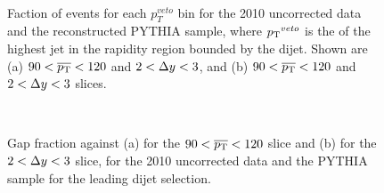 \begin{figure}
\centering
\mbox{
              \quad
              \quad
                              }
\caption[Comparison of $p_T^{veto}$ distribution between the data and the reconstructed PYTHIA sample ]{
Faction of events for each $p_T^{veto}$ bin for the 2010 uncorrected data and the reconstructed PYTHIA sample, where $\mbox{$p_{\rm T}$}{}^{veto}$ is the \pt{} of the highest jet in the rapidity region bounded by the dijet. 
Shown are (a) $90<\mbox{$\overline{p_{\rm T}}$}{}<120$ and $2 < \mbox{$\Delta y$}{} <3$, and (b) $90<\mbox{$\overline{p_{\rm T}}$}{}<120$ and $2 < \mbox{$\Delta y$}{} <3$ slices.
\label{Uncorr_Pt3_dy}}
\end{figure}

\begin{figure}
\centering
\mbox{
              \quad
              \quad
                              }
\caption[Comparison of gap fraction verses \dy{} and \ptb{} between the data and the reconstructed PYTHIA sample for leading \pt{} dijet selection]{
Gap fraction against (a) \dy{} for the $90<\mbox{$\overline{p_{\rm T}}$}{}<120$ slice and (b) \ptb{} for the $2 < \mbox{$\Delta y$}{} <3$ slice, for the 2010 uncorrected data and the PYTHIA sample for the leading \pt{} dijet selection.
\label{Uncorr_GF}}
\end{figure}


